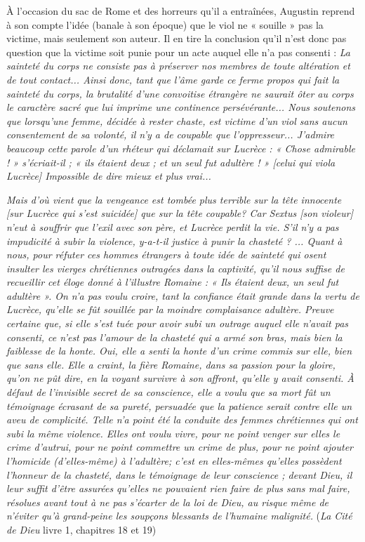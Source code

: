  À l'occasion du sac de Rome et des horreurs qu'il a entraînées, Augustin reprend à son compte l'idée (banale à son époque) que le viol ne « souille » pas la victime, mais seulement son auteur. Il en tire la conclusion qu'il n'est donc pas question que la victime soit punie pour un acte auquel elle n'a pas consenti : \emph{La sainteté du corps ne consiste pas à préserver nos membres de toute altération et de tout contact... Ainsi donc, tant que l'âme garde ce ferme propos qui fait la sainteté du corps, la brutalité d'une convoitise étrangère ne saurait ôter au corps le caractère sacré que lui imprime une continence persévérante... Nous soutenons que lorsqu'une femme, décidée à rester chaste, est victime d'un viol sans aucun consentement de sa volonté, il n'y a de coupable que l'oppresseur... J'admire beaucoup cette parole d'un rhéteur qui déclamait sur Lucrèce : « Chose admirable ! » s'écriait-il ; « ils étaient deux ; et un seul fut adultère ! » \emph{[celui qui viola Lucrèce]} Impossible de dire mieux et plus vrai...}

 \emph{Mais d'où vient que la vengeance est tombée plus terrible sur la tête innocente \emph{[sur Lucrèce qui s'est suicidée]} que sur la tête coupable? Car Sextus \emph{[son violeur]} n'eut à souffrir que l'exil avec son père, et Lucrèce perdit la vie. S'il n'y a pas impudicité à subir la violence, y-a-t-il justice à punir la chasteté ? ... Quant à nous, pour réfuter ces hommes étrangers à toute idée de sainteté qui osent insulter les vierges chrétiennes outragées dans la captivité, qu'il nous suffise de recueillir cet éloge donné à l'illustre Romaine : « Ils étaient deux, un seul fut adultère ». On n'a pas voulu croire, tant la confiance était grande dans la vertu de Lucrèce, qu'elle se fût souillée par la moindre complaisance adultère. Preuve certaine que, si elle s'est tuée pour avoir subi un outrage auquel elle n'avait pas consenti, ce n'est pas l'amour de la chasteté qui a armé son bras, mais bien la faiblesse de la honte. Oui, elle a senti la honte d'un crime commis sur elle, bien que sans elle. Elle a craint, la fière Romaine, dans sa passion pour la gloire, qu'on ne pût dire, en la voyant survivre à son affront, qu'elle y avait consenti. À défaut de l'invisible secret de sa conscience, elle a voulu que sa mort fût un témoignage écrasant de sa pureté, persuadée que la patience serait contre elle un aveu de complicité. Telle n'a point été la conduite des femmes chrétiennes qui ont subi la même violence. Elles ont voulu vivre, pour ne point venger sur elles le crime d'autrui, pour ne point commettre un crime de plus, pour ne point ajouter l'homicide \emph{(d'elles-même)} à l'adultère; c'est en elles-mêmes qu'elles possèdent l'honneur de la chasteté, dans le témoignage de leur conscience ; devant Dieu, il leur suffit d'être assurées qu'elles ne pouvaient rien faire de plus sans mal faire, résolues avant tout à ne pas s'écarter de la loi de Dieu, au risque même de n'éviter qu'à grand-peine les soupçons blessants de l'humaine malignité.} (\emph{La Cité de Dieu} livre 1, chapitres 18 et 19) 

